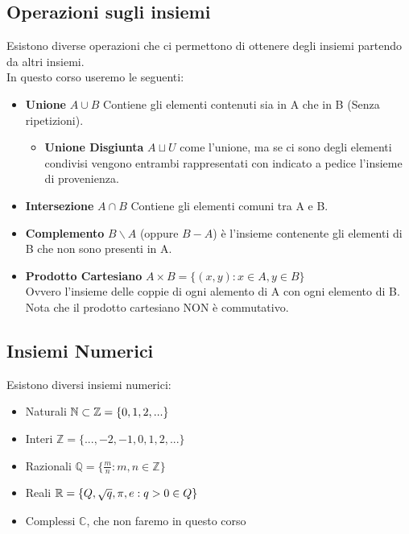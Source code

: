     \subsection*{Operazioni sugli insiemi}
    Esistono diverse operazioni che ci permettono di ottenere degli insiemi partendo da altri insiemi.
    \\In questo corso useremo le seguenti:
    \begin{itemize}
        \item \textbf{Unione} $A \cup B$ Contiene gli elementi contenuti sia in A che in B (Senza ripetizioni).
        \begin{itemize}
            \item \textbf{Unione Disgiunta} $A \sqcup U$ come l'unione, ma se ci sono degli elementi condivisi vengono entrambi rappresentati con indicato a pedice l'insieme di provenienza. 
        \end{itemize}
        \item \textbf{Intersezione}  $A \cap B$ Contiene gli elementi comuni tra A e B.
        \item \textbf{Complemento} $B \backslash A$ (oppure $B-A$) è l'insieme contenente gli elementi di B che non sono presenti in A.
        \item \textbf{Prodotto Cartesiano} $A \times B = \{(x,y) : x\in A, y \in B\} $
        \\Ovvero l'insieme delle coppie di ogni alemento di A con ogni elemento di B. Nota che il prodotto cartesiano NON è commutativo.
    \end{itemize}


    \subsection*{Insiemi Numerici}
    Esistono diversi insiemi numerici:
    \begin{itemize}
        \item Naturali $\mathbb{N} \subset \mathbb{Z} = \{0,1,2,...\}$
        \item Interi $\mathbb{Z} = \{...,-2,-1,0,1,2,...\}$
        \item Razionali $\mathbb{Q} = \{\frac{m}{n}: m,n \in \mathbb{Z}\}$
        \item Reali $\mathbb{R} = \{Q,\sqrt{q}, \pi, e : q>0\in Q\}$
        \item Complessi $\mathbb{C}$, che non faremo in questo corso
    \end{itemize}
